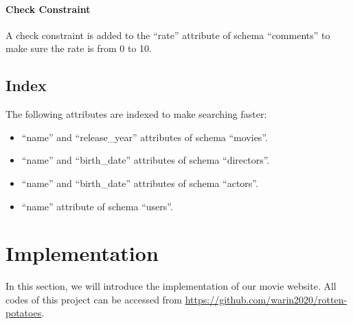 \begin{CJK*}{UTF8}{gbsn}
\paragraph{Check Constraint}
A check constraint is added to the ``rate'' attribute of schema ``comments'' to make sure the rate is from 0 to 10.

\subsection{Index}
The following attributes are indexed to make searching faster:
\begin{itemize}
\item ``name'' and ``release\_year'' attributes of schema ``movies''.
\item ``name'' and ``birth\_date'' attributes of schema ``directors''.
\item ``name'' and ``birth\_date'' attributes of schema ``actors''.
\item ``name'' attribute of schema ``users''.
\end{itemize}

\section{Implementation}
In this section, we will introduce the implementation of our movie website. All codes of this project can be accessed from \href{https://github.com/warin2020/rotten-potatoes}{https://github.com/warin2020/rotten-potatoes}.

\end{CJK*}
